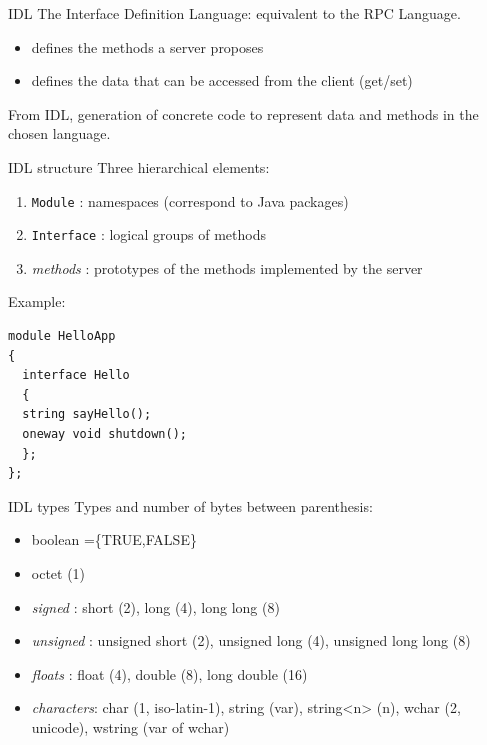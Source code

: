 \documentclass[bigger,hyperref={colorlinks=true, urlcolor=red, plainpages=false, pdfpagelabels, bookmarksnumbered}]{beamer}
\begin{document}
\begin{frame}[label=sec-4-4]{IDL}
The Interface Definition Language:
equivalent to the RPC Language.

\begin{itemize}
\item defines the \alert{methods} a server proposes
\item defines the \alert{data} that can be accessed from the client (get/set)
\end{itemize}

From IDL, generation of concrete code to
represent data and methods in the chosen language.
\end{frame}

\begin{frame}[fragile,label=sec-4-5]{IDL structure}
 Three hierarchical elements:
\begin{enumerate}
\item \texttt{Module} : namespaces (correspond to Java packages)
\item \texttt{Interface} : logical groups of methods
\item \emph{methods} : prototypes of the methods implemented by the server
\end{enumerate}

Example:
\lstset{language=idl,label= ,caption= ,numbers=none}
\begin{lstlisting}
module HelloApp
{
  interface Hello
  {
  string sayHello();
  oneway void shutdown();
  };
};
\end{lstlisting}
\end{frame}

\begin{frame}[label=sec-4-6]{IDL types}
Types and number of bytes between parenthesis: 
\begin{itemize}
\item boolean =\{TRUE,FALSE\}
\item octet (1)
\item \emph{signed} : short (2), long (4), long long (8)
\item \emph{unsigned} : unsigned short (2), unsigned long (4), unsigned long long (8)
\item \emph{floats} : float (4), double (8), long double (16)
\item \emph{characters}: char (1, iso-latin-1), string (var), string<n> (n), wchar (2, unicode), wstring (var of wchar)
\end{itemize}
\end{frame}
\end{document}
